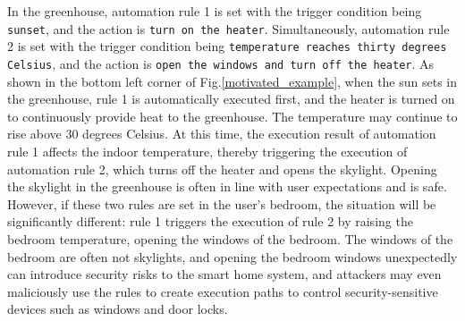 In the greenhouse, automation rule 1 is set with the trigger condition being \texttt{sunset}, and the action is \texttt{turn on the heater}. Simultaneously, automation rule 2 is set with the trigger condition being \texttt{temperature reaches thirty degrees Celsius}, and the action is \texttt{open the windows and turn off the heater}. As shown in the bottom left corner of Fig.\ref{motivated_example}, when the sun sets in the greenhouse, rule 1 is automatically executed first, and the heater is turned on to continuously provide heat to the greenhouse. The temperature may continue to rise above 30 degrees Celsius. At this time, the execution result of automation rule 1 affects the indoor temperature, thereby triggering the execution of automation rule 2, which turns off the heater and opens the skylight. Opening the skylight in the greenhouse is often in line with user expectations and is safe. However, if these two rules are set in the user's bedroom, the situation will be significantly different: rule 1 triggers the execution of rule 2 by raising the bedroom temperature, opening the windows of the bedroom. The windows of the bedroom are often not skylights, and opening the bedroom windows unexpectedly can introduce security risks to the smart home system, and attackers may even maliciously use the rules to create execution paths to control security-sensitive devices such as windows and door locks.

